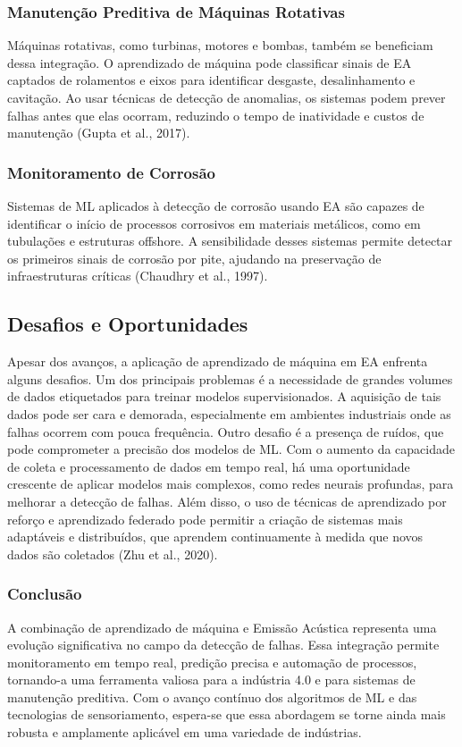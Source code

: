 \subsubsection{Manutenção Preditiva de Máquinas Rotativas}

Máquinas rotativas, como turbinas, motores e bombas, também se beneficiam dessa integração. O aprendizado de máquina pode classificar sinais de EA captados de rolamentos e eixos para identificar desgaste, desalinhamento e cavitação. Ao usar técnicas de detecção de anomalias, os sistemas podem prever falhas antes que elas ocorram, reduzindo o tempo de inatividade e custos de manutenção (Gupta et al., 2017).

\subsubsection{Monitoramento de Corrosão}

Sistemas de ML aplicados à detecção de corrosão usando EA são capazes de identificar o início de processos corrosivos em materiais metálicos, como em tubulações e estruturas offshore. A sensibilidade desses sistemas permite detectar os primeiros sinais de corrosão por pite, ajudando na preservação de infraestruturas críticas (Chaudhry et al., 1997).

\subsection{Desafios e Oportunidades}

Apesar dos avanços, a aplicação de aprendizado de máquina em EA enfrenta alguns desafios. Um dos principais problemas é a necessidade de grandes volumes de dados etiquetados para treinar modelos supervisionados. A aquisição de tais dados pode ser cara e demorada, especialmente em ambientes industriais onde as falhas ocorrem com pouca frequência. Outro desafio é a presença de ruídos, que pode comprometer a precisão dos modelos de ML.
Com o aumento da capacidade de coleta e processamento de dados em tempo real, há uma oportunidade crescente de aplicar modelos mais complexos, como redes neurais profundas, para melhorar a detecção de falhas. Além disso, o uso de técnicas de aprendizado por reforço e aprendizado federado pode permitir a criação de sistemas mais adaptáveis e distribuídos, que aprendem continuamente à medida que novos dados são coletados (Zhu et al., 2020).

\subsubsection{Conclusão}
A combinação de aprendizado de máquina e Emissão Acústica representa uma evolução significativa no campo da detecção de falhas. Essa integração permite monitoramento em tempo real, predição precisa e automação de processos, tornando-a uma ferramenta valiosa para a indústria 4.0 e para sistemas de manutenção preditiva. Com o avanço contínuo dos algoritmos de ML e das tecnologias de sensoriamento, espera-se que essa abordagem se torne ainda mais robusta e amplamente aplicável em uma variedade de indústrias.

